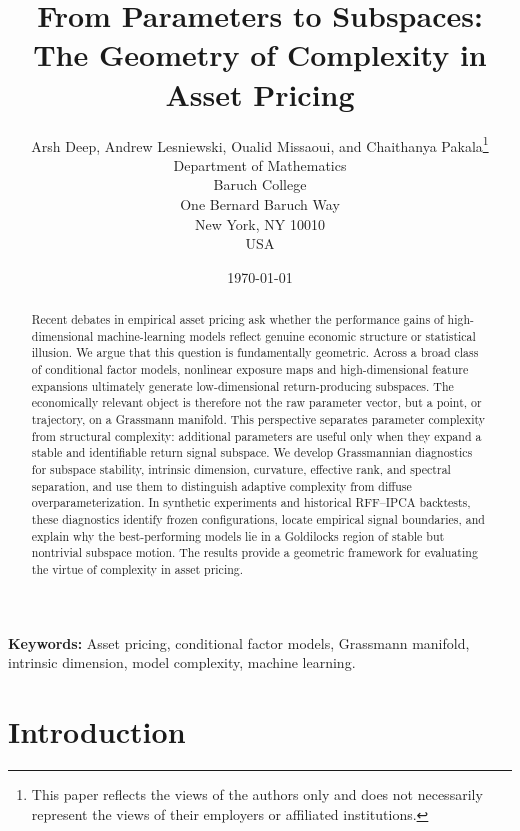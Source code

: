 \documentclass[11pt,letterpaper]{article}
\begin{document}
	
\title{From Parameters to Subspaces: The Geometry of Complexity in Asset Pricing}
\author{Arsh Deep, Andrew Lesniewski, Oualid Missaoui, and Chaithanya Pakala\thanks{This paper reflects the views of the authors only and does not necessarily represent the views of their employers or affiliated institutions.}\\
Department of Mathematics\\
Baruch College\\
One Bernard Baruch Way\\
New York, NY 10010\\
USA}
\date{\today}
\maketitle


\begin{abstract}
Recent debates in empirical asset pricing ask whether the performance gains of high-dimensional machine-learning models reflect genuine economic structure or statistical illusion. We argue that this question is fundamentally geometric. Across a broad class of conditional factor models, nonlinear exposure maps and
high-dimensional feature expansions ultimately generate low-dimensional return-producing subspaces. The economically relevant object is therefore not the raw parameter vector, but a point, or trajectory, on a Grassmann manifold. This perspective separates parameter complexity from structural complexity: additional parameters are useful only when they expand a stable and identifiable return signal subspace. We develop Grassmannian diagnostics for subspace stability, intrinsic dimension, curvature, effective rank, and spectral separation, and use them to distinguish adaptive complexity from diffuse overparameterization. In synthetic experiments and historical RFF--IPCA backtests, these diagnostics identify frozen configurations, locate empirical signal boundaries, and explain why the best-performing models lie in a Goldilocks region of stable but nontrivial subspace motion. The results provide a geometric framework for evaluating the virtue of complexity in asset pricing.
\end{abstract}
\bigskip\noindent
\textbf{Keywords:} Asset pricing, conditional factor models, Grassmann manifold, intrinsic dimension, model complexity, machine learning.
\newpage

\section{Introduction}
\label{sec:intro}
\end{document}
